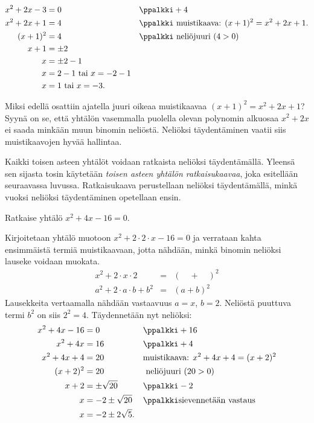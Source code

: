 \begin{align*}
x^2+2x-3 & = 0  &&\ppalkki +4 \\
x^2+2x+1 & = 4  &&\ppalkki \text{ muistikaava: } (x+1)^2=x^2+2x+1. \\
(x+1)^2 & = 4  && \ppalkki \text{ neliöjuuri } (4 > 0)\\
x+1 & = \pm 2 \\
x & = \pm 2 - 1 \\
x & = 2-1 \text{ tai } x= -2-1 \\ 
x & = 1 \text{ tai } x= -3. 
\end{align*}

Miksi edellä osattiin ajatella juuri oikeaa muistikaavaa $(x+1)^2=x^2+2x+1$? Syynä on se, että yhtälön vasemmalla puolella olevan polynomin alkuosaa $x^2+2x$ ei saada minkään muun binomin neliöstä. Neliöksi täydentäminen vaatii siis muistikaavojen hyvää hallintaa.

Kaikki toisen asteen yhtälöt voidaan ratkaista neliöksi täydentämällä. Yleensä sen sijasta tosin käytetään \emph{toisen asteen yhtälön ratkaisukaavaa}, joka esitellään seuraavassa luvussa. Ratkaisukaava perustellaan neliöksi täydentämällä, minkä vuoksi neliöksi täydentäminen opetellaan ensin.

\begin{esimerkki} 
Ratkaise yhtälö $x^2+4x-16 = 0$. 

Kirjoitetaan yhtälö muotoon $x^2+2\cdot 2\cdot x-16 = 0$ ja verrataan kahta ensimmäistä termiä muistikaavaan, jotta nähdään, minkä binomin neliöksi lauseke voidaan muokata.
\[ \begin{array}{lcl}
x^2+2\cdot x\cdot 2  &=& (\quad + \quad)^2\\
a^2 +2\cdot a\cdot b +b^2 &=& (a+b)^2
\end{array} \]
Lausekkeita vertaamalla nähdään vastaavuus $a = x$, $b = 2$. Neliöstä puuttuva termi $b^2$ on siis $2^2=4$. Täydennetään nyt neliöksi:
\begin{align*}
x^2+4x-16 &= 0 && \ppalkki +16 \\
x^2+4x &= 16 && \ppalkki +4\\
x^2+4x+4 &= 20 &&  \text{muistikaava: $ x^2+4x+4= (x+2)^2$} \\
(x+2)^2 &= 20  && \text{ neliöjuuri } (20 > 0) \\
x+2 &= \pm \sqrt{20} && \ppalkki -2\\
x &= -2 \pm \sqrt{20} && \ppalkki \text{sievennetään vastaus} \\
x &= -2 \pm 2\sqrt{5}.
\end{align*}
\end{esimerkki}

